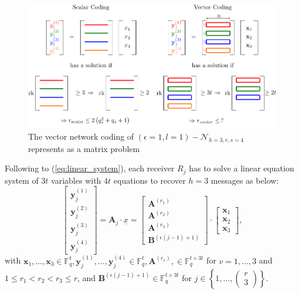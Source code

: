 \begin{figure}[H]
\caption{The vector network coding of $(\epsilon=1,l=1)-\mathcal{N}_{h=3,r,s=4}$
represents as a matrix problem \label{fig:rk_h3}}

\centering{}\includegraphics[width=0.6\paperwidth]{./figures/rk_h3}
\end{figure}

Following to (\ref{eq:linear_system}), each receiver $R_{j}$ has
to solve a linear equation system of $3t$ variables with $4t$ equations
to recover $h=3$ messages as below:
\begin{equation}
\left[\begin{array}{c}
\boldsymbol{y}_{j}^{\left(1\right)}\\
\boldsymbol{y}_{j}^{\left(2\right)}\\
\boldsymbol{y}_{j}^{\left(3\right)}\\
\boldsymbol{y}_{j}^{\left(4\right)}
\end{array}\right]=\boldsymbol{A}_{j}\cdot\underline{x}=\left[\begin{array}{c}
\boldsymbol{A}^{\left(r_{1}\right)}\\
\boldsymbol{A}^{\left(r_{2}\right)}\\
\boldsymbol{A}^{\left(r_{3}\right)}\\
\boldsymbol{B}^{\left(\epsilon\left(j-1\right)+1\right)}
\end{array}\right]\cdot\left[\begin{array}{c}
\boldsymbol{x}_{1}\\
\boldsymbol{x}_{2}\\
\boldsymbol{x}_{3}
\end{array}\right],\label{eq:linear_system_h3rs4}
\end{equation}
with $\boldsymbol{x}_{1},\ldots,\boldsymbol{x}_{3}\in\ensuremath{\mathbb{F}}_{q}^{t},\boldsymbol{y}_{j}^{\left(1\right)},\ldots,\boldsymbol{y}_{j}^{\left(4\right)}\in\ensuremath{\mathbb{F}}_{q}^{t},\boldsymbol{A}^{\left(r_{v}\right)},\in\ensuremath{\mathbb{F}}_{q}^{t\times3t}$
for $v=1,\ldots,3$ and $1\leq r_{1}<r_{2}<r_{3}\leq r$, and $\boldsymbol{B}^{\left(\epsilon\left(j-1\right)+1\right)}\in\ensuremath{\mathbb{F}}_{q}^{t\times3t}$
for $j\in\left\{ 1,\ldots,\left(\begin{array}{c}
r\\
3
\end{array}\right)\right\} $.

